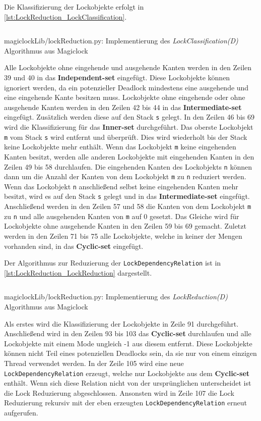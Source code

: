 Die Klassifizierung der Lockobjekte erfolgt in
\cref{lst:LockReduction_LockClassification}.
\begin{listing}[ht]
  \inputminted[frame=lines,linenos,firstline=35,lastline=77]{python}{./Python/magiclockLib/lockReduction.py}
  \caption{magiclockLib/lockReduction.py: Implementierung des \textit{LockClassification(D)} Algorithmus aus Magiclock\autocite[5]{MagicLock}}
  \label{lst:LockReduction_LockClassification}
\end{listing}
Alle Lockobjekte ohne eingehende und ausgehende Kanten werden in den Zeilen 39
und 40 in das \textbf{Independent-set} eingefügt. Diese Lockobjekte können
ignoriert werden, da ein potenzieller Deadlock mindestens eine ausgehende und
eine eingehende Kante besitzen muss. Lockobjekte ohne eingehende oder ohne
ausgehende Kanten werden in den Zeilen 42 bis 44 in das
\textbf{Intermediate-set} eingefügt. Zusätzlich werden diese auf den Stack
\texttt{s} gelegt. In den Zeilen 46 bis 69 wird die Klassifizierung für das
\textbf{Inner-set} durchgeführt. Das oberste Lockobjekt \texttt{m} vom Stack \texttt{s}
wird entfernt und überprüft. Dies wird wiederholt bis der Stack keine
Lockobjekte mehr enthält. Wenn das Lockobjekt \texttt{m} keine eingehenden
Kanten besitzt, werden alle anderen Lockobjekte mit eingehenden Kanten in den
Zeilen 49 bis 58 durchlaufen. Die eingehenden Kanten des Lockobjekts \texttt{n}
können dann um die Anzahl der Kanten von dem Lockobjekt \texttt{m} zu \texttt{n}
reduziert werden. Wenn das Lockobjekt \texttt{n} anschließend selbst keine
eingehenden Kanten mehr besitzt, wird es auf den Stack \texttt{s} gelegt und in
das \textbf{Intermediate-set} eingefügt. Anschließend werden in den Zeilen 57
und 58 die Kanten von dem Lockobjekt \texttt{m} zu \texttt{n} und alle
ausgehenden Kanten von \texttt{m} auf 0 gesetzt. Das Gleiche wird für
Lockobjekte ohne ausgehende Kanten in den Zeilen 59 bis 69 gemacht. Zuletzt
werden in den Zeilen 71 bis 75 alle Lockobjekte, welche in keiner der Mengen
vorhanden sind, in das \textbf{Cyclic-set} eingefügt.

Der Algorithmus zur Reduzierung der \texttt{LockDependencyRelation} ist in
\cref{lst:LockReduction_LockReduction} dargestellt.
\begin{listing}[ht]
  \inputminted[frame=lines,linenos,firstline=90]{python}{./Python/magiclockLib/lockReduction.py}
  \caption{magiclockLib/lockReduction.py: Implementierung des \textit{LockReduction(D)} Algorithmus aus Magiclock\autocite[5]{MagicLock}}
  \label{lst:LockReduction_LockReduction}
\end{listing}
Als erstes wird die Klassifizierung der Lockobjekte in Zeile 91 durchgeführt.
Anschließend wird in den Zeilen 93 bis 103 das \textbf{Cyclic-set} durchlaufen
und alle Lockobjekte mit einem Mode ungleich -1 aus diesem entfernt. Diese
Lockobjekte können nicht Teil eines potenziellen Deadlocks sein, da sie nur von
einem einzigen Thread verwendet werden. In der Zeile 105 wird eine neue
\texttt{LockDependencyRelation} erzeugt, welche nur Lockobjekte aus dem
\textbf{Cyclic-set} enthält. Wenn sich diese Relation nicht von der
ursprünglichen unterscheidet ist die Lock Reduzierung abgeschlossen. Ansonsten
wird in Zeile 107 die Lock Reduzierung rekursiv mit der eben erzeugten
\texttt{LockDependencyRelation} erneut aufgerufen.

